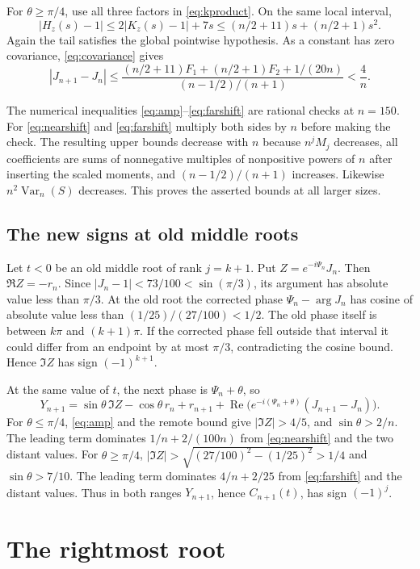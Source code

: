 \documentclass[11pt]{article}
\begin{document}
For $\theta\ge\pi/4$, use all three factors in \eqref{eq:kproduct}. On the same local interval,
\[
|H_z(s)-1|\le2|K_z(s)-1|+7s
\le (n/2+11)s+(n/2+1)s^2.
\]
Again the tail satisfies the global pointwise hypothesis. As a constant has zero covariance, \eqref{eq:covariance} gives
\begin{equation}
|J_{n+1}-J_n|
\le\frac{(n/2+11)F_1+(n/2+1)F_2+1/(20n)}
          {(n-1/2)/(n+1)}
<\frac4n.
\label{eq:farshift}
\end{equation}

The numerical inequalities \eqref{eq:amp}--\eqref{eq:farshift} are rational checks at $n=150$. For \eqref{eq:nearshift} and \eqref{eq:farshift} multiply both sides by $n$ before making the check. The resulting upper bounds decrease with $n$ because $n^jM_j$ decreases, all coefficients are sums of nonnegative multiples of nonpositive powers of $n$ after inserting the scaled moments, and $(n-1/2)/(n+1)$ increases. Likewise $n^2\operatorname{Var}_n(S)$ decreases. This proves the asserted bounds at all larger sizes.

\subsection{The new signs at old middle roots}
Let $t<0$ be an old middle root of rank $j=k+1$. Put $Z=e^{-i\Psi_n}J_n$. Then $\Re Z=-r_n$. Since $|J_n-1|<73/100<\sin(\pi/3)$, its argument has absolute value less than $\pi/3$. At the old root the corrected phase $\Psi_n-\arg J_n$ has cosine of absolute value less than $(1/25)/(27/100)<1/2$. The old phase itself is between $k\pi$ and $(k+1)\pi$. If the corrected phase fell outside that interval it could differ from an endpoint by at most $\pi/3$, contradicting the cosine bound. Hence $\Im Z$ has sign $(-1)^{k+1}$.

At the same value of $t$, the next phase is $\Psi_n+\theta$, so
\[
Y_{n+1}=\sin\theta\,\Im Z-\cos\theta\,r_n+r_{n+1}
       +\operatorname{Re}\bigl(e^{-i(\Psi_n+\theta)}(J_{n+1}-J_n)\bigr).
\]
For $\theta\le\pi/4$, \eqref{eq:amp} and the remote bound give $|\Im Z|>4/5$, and $\sin\theta>2/n$. The leading term dominates $1/n+2/(100n)$ from \eqref{eq:nearshift} and the two distant values. For $\theta\ge\pi/4$, $|\Im Z|>\sqrt{(27/100)^2-(1/25)^2}>1/4$ and $\sin\theta>7/10$. The leading term dominates $4/n+2/25$ from \eqref{eq:farshift} and the distant values. Thus in both ranges $Y_{n+1}$, hence $C_{n+1}(t)$, has sign $(-1)^j$.

\section{The rightmost root}\label{sec:right}
\end{document}
